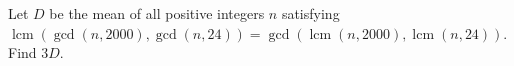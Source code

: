 Let $D$ be the mean of all positive integers $n$ satisfying $\operatorname{lcm}(\gcd(n,2000),\gcd(n,24))=\gcd(\operatorname{lcm}(n,2000),\operatorname{lcm}(n,24))$. Find $3D$.
